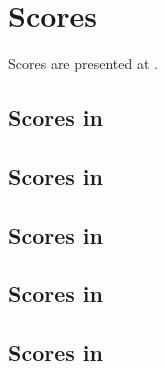 



\chapter{Scores}\label{Scores}

Scores are presented at .


\section{Scores in \mxsrToMsr{}}


\section{Scores in \mxsrToMsr{}}


\section{Scores in \msrToMsr{}}


\section{Scores in \msrToLpsr{}}


\section{Scores in \lpsrToLilypond{}}


